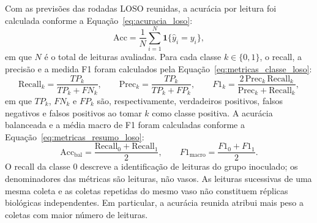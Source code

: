 Com as previsões das rodadas LOSO reunidas, a acurácia por leitura foi
calculada conforme a Equação~\eqref{eq:acuracia_loso}:
\begin{equation}
    \mathrm{Acc}=\frac{1}{N}
    \sum_{i=1}^{N}\mathbf{1}\{\widehat y_i=y_i\},
    \label{eq:acuracia_loso}
\end{equation}
em que $N$ é o total de leituras avaliadas. Para cada classe
$k\in\{0,1\}$, o recall, a precisão e a medida F1 foram calculados
pela Equação~\eqref{eq:metricas_classe_loso}:
\begin{equation}
    \mathrm{Recall}_k=\frac{TP_k}{TP_k+FN_k},\qquad
    \mathrm{Prec}_k=\frac{TP_k}{TP_k+FP_k},\qquad
    F1_k=\frac{2\,\mathrm{Prec}_k\,\mathrm{Recall}_k}
    {\mathrm{Prec}_k+\mathrm{Recall}_k},
    \label{eq:metricas_classe_loso}
\end{equation}
em que $TP_k$, $FN_k$ e $FP_k$ são, respectivamente, verdadeiros positivos,
falsos negativos e falsos positivos ao tomar $k$ como classe positiva.
A acurácia balanceada e a média macro de F1 foram calculadas conforme a
Equação~\eqref{eq:metricas_resumo_loso}:
\begin{equation}
    \mathrm{Acc}_{\mathrm{bal}}=
    \frac{\mathrm{Recall}_0+\mathrm{Recall}_1}{2},
    \qquad
    F1_{\mathrm{macro}}=\frac{F1_0+F1_1}{2}.
    \label{eq:metricas_resumo_loso}
\end{equation}
O recall da classe 0 descreve a identificação de leituras do grupo
inoculado; os denominadores das métricas são leituras, não vasos. As
leituras sucessivas de uma mesma coleta e as coletas repetidas do mesmo
vaso não constituem réplicas biológicas independentes. Em particular,
a acurácia reunida atribui mais peso a coletas com maior número de leituras.
